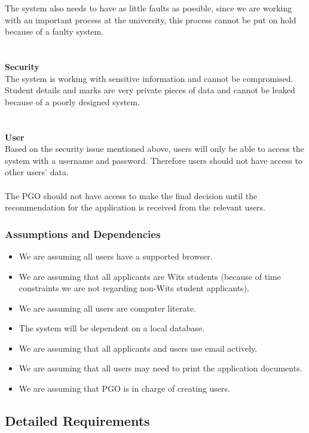 \documentclass{article}
\begin{document}
The system also needs to have as little faults as possible, since we are working with an important process at the university, this process cannot be put on hold because of a faulty system. \\ \\ \\
\textbf{Security} \\
The system is working with sensitive information and cannot be compromised. Student details and marks are very private pieces of data and cannot be leaked because of a poorly designed system. \\ \\ \\
\textbf{User} \\
Based on the security issue mentioned above, users will only be able to access the system with a username and password. Therefore users should not have access to other users' data. \\ \\
The PGO should not have access to make the final decision until the recommendation for the application is received from the relevant users. \\ 
\subsubsection{Assumptions and Dependencies}
\begin{itemize}
\item We are assuming all users have a supported browser.
\item We are assuming that all applicants are Wits students (because of time constraints we are not regarding non-Wits student applicants).
\item We are assuming all users are computer literate. 
\item The system will be dependent on a local database.
\item We are assuming that all applicants and users use email actively.
\item We are assuming that all users may need to print the application documents.
\item We are assuming that PGO is in charge of creating users.
\end{itemize}
\subsection{Detailed Requirements}
\end{document}
